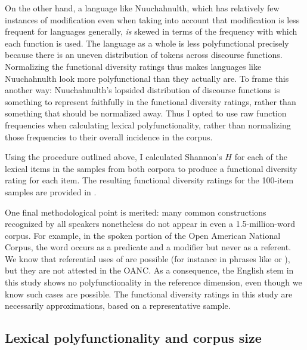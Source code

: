 On the other hand, a language like Nuuchahnulth, which has relatively few instances of modification even when taking into account that modification is less frequent for languages generally, \emph{is} skewed in terms of the frequency with which each function is used. The language as a whole is less polyfunctional precisely because there is an uneven distribution of tokens across discourse functions. Normalizing the functional diversity ratings thus makes languages like Nuuchahnulth look more polyfunctional than they actually are. To frame this another way: Nuuchahnulth's lopsided distribution of discourse functions is something to represent faithfully in the functional diversity ratings, rather than something that should be normalized away. Thus I opted to use raw function frequencies when calculating lexical polyfunctionality, rather than normalizing those frequencies to their overall incidence in the corpus.

Using the procedure outlined above, I calculated Shannon's $H$ for each of the lexical items in the samples from both corpora to produce a functional diversity rating for each item. The resulting functional diversity ratings for the 100-item samples are provided in .

One final methodological point is merited: many common constructions recognized by all speakers nonetheless do not appear in even a 1.5-million-word corpus. For example, in the spoken portion of the Open American National Corpus, the word  occurs as a predicate and a modifier but never as a referent. We know that referential uses of  are possible (for instance in phrases like  or ), but they are not attested in the OANC. As a consequence, the English stem  in this study shows no polyfunctionality in the reference dimension, even though we know such cases are possible. The functional diversity ratings in this study are necessarily approximations, based on a representative sample.

\subsection{Lexical polyfunctionality and corpus size}
\label{sec:3.4.2}

